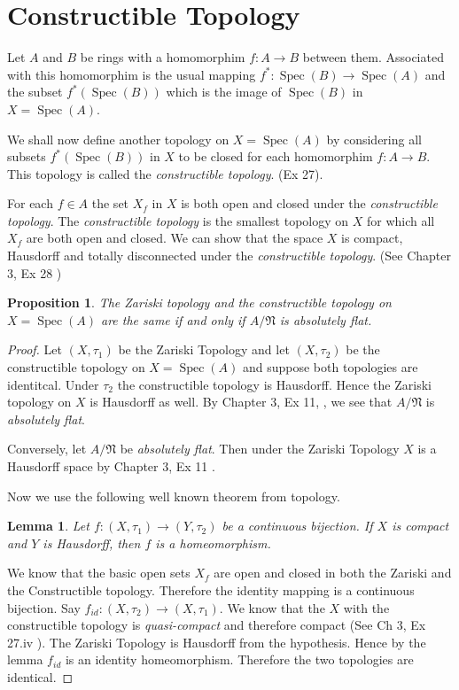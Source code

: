 \documentclass[]{report}
\newtheorem{prop}[theorem]{Proposition}
\newtheorem{lemma}[theorem]{Lemma}
\DeclareMathOperator\Spec{Spec}
\newcommand\mfk[1]{\mathfrak{#1}}
\begin{document}
\section{Constructible Topology}

Let $A$ and $B$ be rings with a homomorphim $f: A \rightarrow B$ between them. Associated with this homomorphim is the usual mapping $f^*: \Spec(B) \rightarrow \Spec(A)$ and the subset $f^*(\Spec(B))$ which is the image of $\Spec(B)$ in $X = \Spec(A)$.

We shall now define another topology on $X = \Spec(A)$ by considering all subsets $f^*(\Spec(B))$ in $X$ to be closed for each homomorphim $f: A \rightarrow B$. This topology is called the \textit{constructible topology}. (Ex 27).

For each $f \in A$ the set $X_f$ in $X$ is both open and closed under the \textit{constructible topology}. The \textit{constructible topology} is the smallest topology on $X$ for which all $X_f$ are both open and closed. We can show that the space $X$ is compact, Hausdorff and totally disconnected under the \textit{constructible topology}. (See Chapter 3, Ex 28 \cite{atiyah1})

\begin{prop}
    The Zariski topology and the constructible topology on $X = \Spec(A)$ are the same if and only if $A/\mfk{N}$ is \textit{absolutely flat}.
\end{prop}

\begin{proof}
    Let $(X,\tau_1)$ be the Zariski Topology and let $(X, \tau_2)$ be the constructible topology on $X = \Spec(A)$ and suppose both topologies are identitcal. Under $\tau_2$ the constructible topology is Hausdorff. Hence the Zariski topology on $X$ is Hausdorff as well. By Chapter 3, Ex 11, \cite{atiyah1}, we see that $A/\mathfrak{N}$ is \textit{absolutely flat}.

    Conversely, let $A/\mathfrak{N}$ be \textit{absolutely flat}. Then under the Zariski Topology $X$ is a Hausdorff space by Chapter 3, Ex 11 \cite{atiyah1}.

    Now we use the following well known theorem from topology.
    \begin{lemma}
        Let $f: (X, \tau_1) \rightarrow (Y, \tau_2)$ be a continuous bijection. If $X$ is compact and $Y$ is Hausdorff, then $f$ is a homeomorphism.
    \end{lemma}

    We know that the basic open sets $X_f$ are open and closed in both the Zariski and the Constructible topology. Therefore the identity mapping is a continuous bijection. Say $f_{id}: (X,\tau_2) \rightarrow (X, \tau_1)$. We know that the $X$ with the constructible topology is \textit{quasi-compact} and therefore compact (See Ch 3, Ex 27.iv \cite{atiyah1}). The Zariski Topology is Hausdorff from the hypothesis. Hence by the lemma $f_{id}$ is an identity homeomorphism. Therefore the two topologies are identical.
\end{proof}
\end{document}
